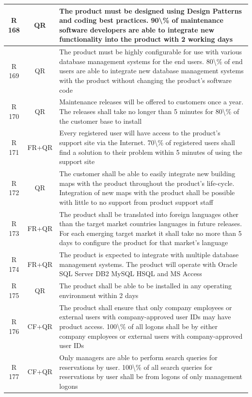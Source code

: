 \documentclass[dissertation,final]{softeng}
\begin{document}
\begin{appendices}
{\begin{center}
\begin{longtable}{c c m{}}
    R 168   & QR & The product must be designed using Design Patterns and coding best practices. 90\textbackslash{}\% of maintenance software developers are able to integrate new functionality into the product with 2 working days \\    \midrule
    R 169   & QR & The product must be highly configurable for use with various database management systems for the end users. 80\textbackslash{}\% of end users are able to integrate new database management systems with the product without changing the product's software code \\    \midrule
    R 170   & QR & Maintenance releases will be offered to customers once a year. The releases shall take no longer than 5 minutes for 80\textbackslash{}\% of the customer base to install \\    \midrule
    R 171   & FR+QR & Every registered user will have access to the product's support site via the Internet. 70\textbackslash{}\% of registered users shall find a solution to their problem within 5 minutes of using the support site \\    \midrule
    R 172   & QR & The customer shall be able to easily integrate new building maps with the product throughout the product's life-cycle. Integration of new maps with the product shall be possible with little to no support from product support staff \\    \midrule
    R 173   & FR+QR & The product shall be translated into foreign languages other than the target market countries languages in future releases. For each emerging target market it shall take no more than 5 days to configure the product for that market's language \\    \midrule
    R 174   & FR+QR & The product is expected to integrate with multiple database management systems. The product will operate with Oracle SQL Server DB2 MySQL HSQL and MS Access \\    \midrule
    R 175   & QR & The product shall be able to be installed in any operating environment within 2 days \\    \midrule
    R 176   & CF+QR & The product shall ensure that only company employees or external users with company-approved user IDs may have product access. 100\textbackslash{}\% of all logons shall be by either company employees or external users with company-approved user IDs \\    \midrule
    R 177   & CF+QR & Only managers are able to perform search queries for reservations by user. 100\textbackslash{}\% of all search queries for reservations by user shall be from logons of only management logons \\    \midrule

\end{longtable}
\end{center}}
\end{appendices}
\end{document}
